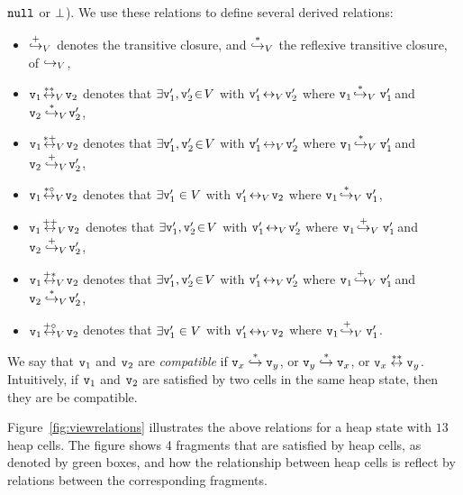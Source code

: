 ${\tt null}$ or $\bot$).
We use these relations to define several derived relations:
\begin{itemize}
\item $\overset{+}\hookrightarrow_{V}$ denotes the transitive closure,
  and
   $\overset{*}\hookrightarrow_{V}$ the reflexive transitive closure, of
  $\hookrightarrow_{V}$,
\item $\mathtt{v}_1 \!  \overset{**}\leftrightarrow_{V}  \! \mathtt{v}_2$ denotes that 
  $\exists \mathtt{v}_1',\mathtt{v}_2' \!\in\! V$ with $\mathtt{v}_1' \! \leftrightarrow_{V} \! \mathtt{v}_2'$ where
  $\mathtt{v}_1 \!  \overset{*}\hookrightarrow_{V} \mathtt{v}_1' \!$ and $\mathtt{v}_2  \overset{*}\hookrightarrow_{V} \! \mathtt{v}_2'$,
\item $\mathtt{v}_1 \!  \overset{*+}\leftrightarrow_{V}  \! \mathtt{v}_2$ denotes that
  $\exists \mathtt{v}_1', \mathtt{v}_2' \!\in\! V$ with $\mathtt{v}_1' \! \leftrightarrow_{V} \! \mathtt{v}_2'$ where
  $\mathtt{v}_1 \!  \overset{*}\hookrightarrow_{V} \mathtt{v}_1' \!$ and $\mathtt{v}_2  \overset{+}\hookrightarrow_{V} \! \mathtt{v}_2'$,
\item $\mathtt{v}_1 \!  \overset{*\circ}\leftrightarrow_{V}  \! \mathtt{v}_2$ denotes that $\exists \mathtt{v}_1' \in V$ with $\mathtt{v}_1' \! \leftrightarrow_{V} \! \mathtt{v}_2$ where
  $\mathtt{v}_1 \!  \overset{*}\hookrightarrow_{V} \mathtt{v}_1'$,
\item $\mathtt{v}_1 \!  \overset{++}\leftrightarrow_{V}  \! \mathtt{v}_2$ denotes that
  $\exists \mathtt{v}_1',\mathtt{v}_2' \!\in\! V$ with $\mathtt{v}_1' \! \leftrightarrow_{V} \! \mathtt{v}_2'$ where
  $\mathtt{v}_1 \!  \overset{+}\hookrightarrow_{V} \mathtt{v}_1' \!$ and $\mathtt{v}_2  \overset{+}\hookrightarrow_{V} \! \mathtt{v}_2'$,
\item $\mathtt{v}_1 \!  \overset{+*}\leftrightarrow_{V}  \! \mathtt{v}_2$ denotes that
  $\exists \mathtt{v}_1',\mathtt{v}_2' \!\in\! V$ with $\mathtt{v}_1' \! \leftrightarrow_{V} \! \mathtt{v}_2'$ where
  $\mathtt{v}_1 \!  \overset{+}\hookrightarrow_{V} \mathtt{v}_1' \!$ and $\mathtt{v}_2  \overset{*}\hookrightarrow_{V} \! \mathtt{v}_2'$,
\item $\mathtt{v}_1 \!  \overset{+\circ}\leftrightarrow_{V}  \! \mathtt{v}_2$ denotes that
  $\exists \mathtt{v}_1' \in V$ with $\mathtt{v}_1' \! \leftrightarrow_{V} \! \mathtt{v}_2$ where
  $\mathtt{v}_1 \!  \overset{+}\hookrightarrow_{V} \mathtt{v}_1'$.
\end{itemize}
We say that $\mathtt{v}_1$ and $\mathtt{v}_2$ are {\em compatible} if $\mathtt{v}_x \overset{*}\hookrightarrow \mathtt{v}_y$, or $\mathtt{v}_y \overset{*}\hookrightarrow \mathtt{v}_x$, or $\mathtt{v}_x \overset{**}\leftrightarrow \mathtt{v}_y$. Intuitively, if $\mathtt{v}_1$ and
$\mathtt{v}_2$ are satisfied by two cells in the same heap state, then they are
be compatible.

Figure~\ref{fig:viewrelations} illustrates the above relations for a heap state
with $13$ heap cells. The figure shows 4 fragments that are satisfied by heap
cells, as denoted by green boxes, and how the relationship between heap cells
is reflect by relations between the corresponding fragments.

